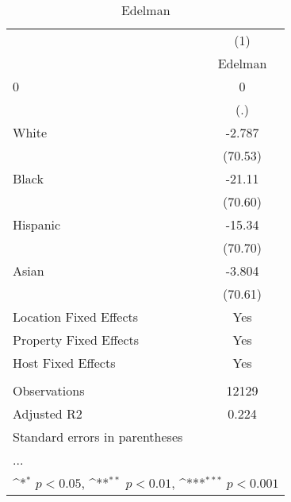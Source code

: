\begin{table}[htbp]\centering
\def\sym#1{\ifmmode^{#1}\else\(^{#1}\)\fi}
\caption{Edelman}
\begin{tabular}{l*{1}{c}}
\hline\hline
                    &\multicolumn{1}{c}{(1)}\\
                    &\multicolumn{1}{c}{Edelman}\\
\hline
0                   &           0         \\
                    &         (.)         \\
[1em]
White               &      -2.787         \\
                    &     (70.53)         \\
[1em]
Black               &      -21.11         \\
                    &     (70.60)         \\
[1em]
Hispanic            &      -15.34         \\
                    &     (70.70)         \\
[1em]
Asian               &      -3.804         \\
                    &     (70.61)         \\
\hline
Location Fixed Effects&         Yes         \\
Property Fixed Effects&         Yes         \\
Host Fixed Effects  &         Yes         \\
\hline \vspace{-1.25em}&                     \\
Observations        &       12129         \\
Adjusted R2         &       0.224         \\
\hline\hline
\multicolumn{2}{l}{\footnotesize Standard errors in parentheses}\\
\multicolumn{2}{l}{\footnotesize ...}\\
\multicolumn{2}{l}{\footnotesize \sym{*} \(p<0.05\), \sym{**} \(p<0.01\), \sym{***} \(p<0.001\)}\\
\end{tabular}
\end{table}
